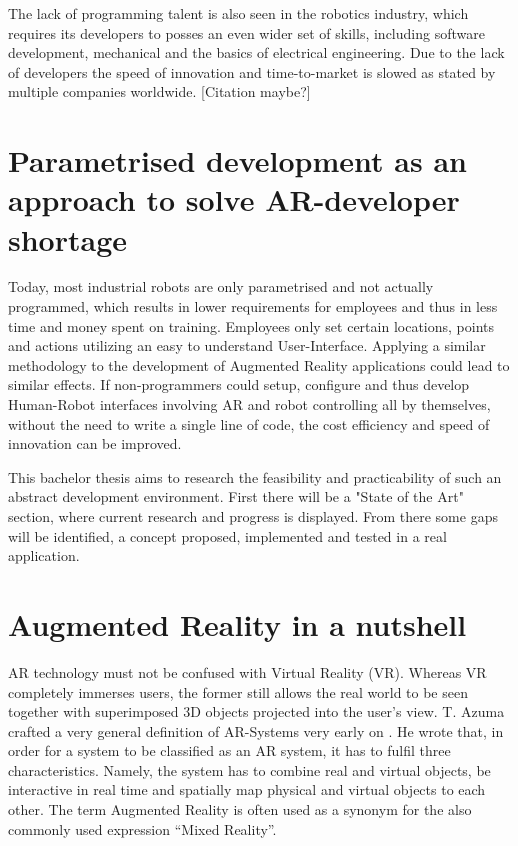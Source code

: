 The lack of programming talent is also seen in the robotics industry, which requires its developers to posses an even wider set of skills, including software development, mechanical and the basics of electrical engineering. Due to the lack of developers the speed of innovation and time-to-market is slowed as stated by multiple companies worldwide. [Citation maybe?]

\section{Parametrised development as an approach to solve AR-developer shortage}
Today, most industrial robots are only parametrised and not actually programmed, which results in lower requirements for employees and thus in less time and money spent on training. Employees only set certain locations, points and actions utilizing an easy to understand User-Interface. Applying a similar methodology to the development of Augmented Reality applications could lead to similar effects. If non-programmers could setup, configure and thus develop Human-Robot interfaces involving AR and robot controlling all by themselves, without the need to write a single line of code, the cost efficiency and speed of innovation can be improved.

This bachelor thesis aims to research the feasibility and practicability of such an abstract development environment. First there will be a "State of the Art" section, where current research and progress is displayed. From there some gaps will be identified, a concept proposed, implemented and tested in a real application.

\section{Augmented Reality in a nutshell}

AR technology must not be confused with Virtual Reality (VR). Whereas VR completely immerses
users, the former still allows the real world to be seen together with superimposed 3D objects
projected into the user's view. T. Azuma crafted a very general definition of AR-Systems very early
on \cite{azuma1997survey}. He wrote that, in order for a system to be classified as an AR system, it has to fulfil three
characteristics. Namely, the system has to combine real and virtual objects, be interactive in real time
and spatially map physical and virtual objects to each other. The term Augmented Reality is often
used as a synonym for the also commonly used expression “Mixed Reality”. 

